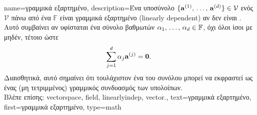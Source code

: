 {name={\foreignlanguage{greek}{γραμμικά εξαρτημένο}},
	description={\foreignlanguage{greek}{Ένα υποσύνολο $\{{\bf a}^{(1)}, \,\ldots, \,{\bf a}^{(d)}\} \in \mathcal{V}$ 
		ενός}  $\mathcal{V}$ \foreignlanguage{greek}{πάνω από ένα}  
		$\mathbb{F}$ \foreignlanguage{greek}{είναι γραμμικά εξαρτημένο} 
		(linearly dependent) \foreignlanguage{greek}{αν δεν είναι} . 
		\foreignlanguage{greek}{Αυτό συμβαίνει αν υφίσταται ένα σύνολο βαθμωτών $\alpha_1, \,\ldots, \,\alpha_{d} \in \mathbb{F}$, 
		όχι όλοι ίσοι με μηδέν, τέτοιο ώστε 
		$$\sum_{j=1}^{d} \alpha_{j} {\bf a}^{(j)} = \mathbf{0}.$$ 
		Διαισθητικά, αυτό σημαίνει ότι τουλάχιστον ένα}  \foreignlanguage{greek}{του συνόλου μπορεί να εκφραστεί 
		ως ένας (μη τετριμμένος) γραμμικός συνδυασμός των υπολοίπων}. 
		\\ 
		\foreignlanguage{greek}{Βλέπε επίσης:} \gls{vectorspace}, \gls{field}, \gls{linearlyindep}, \gls{vector}.},
	text={\foreignlanguage{greek}{γραμμικά εξαρτημένο}},
	first={\foreignlanguage{greek}{γραμμικά εξαρτημένο}},
	type=math
}

